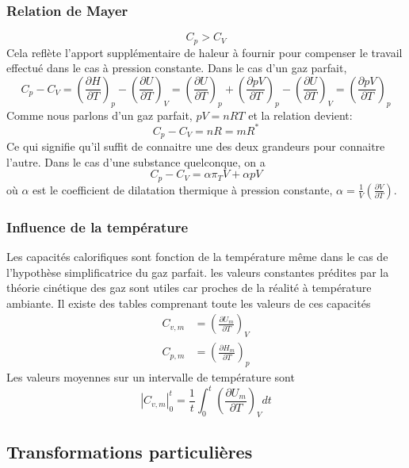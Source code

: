 \subsubsection{Relation de Mayer}
\[ C_p > C_V \]
Cela reflète l'apport supplémentaire de haleur à fournir pour
compenser le travail effectué dans le cas à pression constante.
Dans le cas d'un gaz parfait,
\[ C_p-C_V = \left(\frac{\partial H}{\partial T}\right)_p -
\left(\frac{\partial U}{\partial T}\right)_V =
\left(\frac{\partial U}{\partial T}\right)_p +
\left(\frac{\partial pV}{\partial T}\right)_p -
\left(\frac{\partial U}{\partial T}\right)_V =
\left(\frac{\partial pV}{\partial T}\right)_p \]
Comme nous parlons d'un gaz parfait, $pV = nRT$ et la relation devient:
\[ C_p-C_V = nR = mR^* \]
Ce qui signifie qu'il suffit de connaitre
une des deux grandeurs pour connaitre l'autre.
Dans le cas d'une substance quelconque, on a
\[ C_p-C_V = \alpha \pi_T V + \alpha pV \]
où $\alpha$ est le coefficient de dilatation thermique à pression constante,
$\alpha = \frac 1V \left(\frac{\partial V}{\partial T}\right)$.

\subsubsection{Influence de la température}
Les capacités calorifiques sont fonction de la température
même dans le cas de l'hypothèse simplificatrice du gaz parfait.
les valeurs constantes prédites par la théorie cinétique des gaz sont
utiles car proches de la réalité à température ambiante.
Il existe des tables comprenant toute les valeurs de ces capacités
\begin{align*}
C_{v,m} & = \left(\frac{\partial U_m}{\partial T}\right )_V\\
C_{p,m} & = \left(\frac{\partial H_m}{\partial T}\right )_p
\end{align*}
Les valeurs moyennes sur un intervalle de température sont
\[ |C_{v,m}|_0^t =
\frac 1t \int_0^t \left(\frac{\partial U_m}{\partial T}\right )_V dt \]

\subsection{Transformations particulières}
